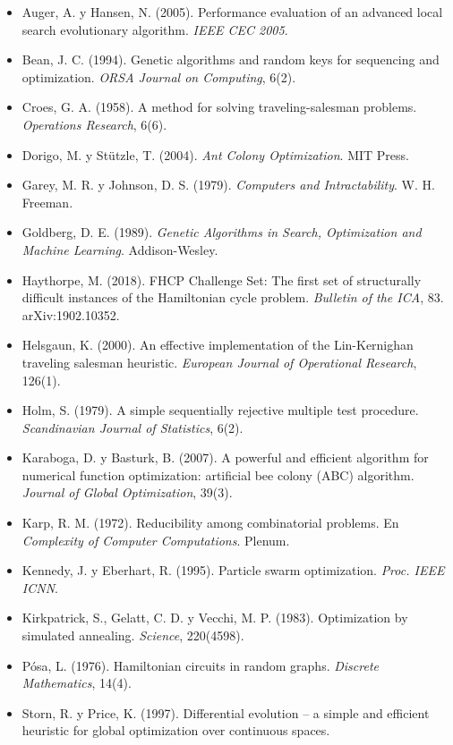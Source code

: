 \documentclass[
  spanish,
  12pt,
]{article}
\providecommand{\tightlist}{%
  \setlength{\itemsep}{0pt}\setlength{\parskip}{0pt}}
\begin{document}
\begin{itemize}
\tightlist
\item
  Auger, A. y Hansen, N. (2005). Performance evaluation of an advanced
  local search evolutionary algorithm. \emph{IEEE CEC 2005}.
\item
  Bean, J. C. (1994). Genetic algorithms and random keys for sequencing
  and optimization. \emph{ORSA Journal on Computing}, 6(2).
\item
  Croes, G. A. (1958). A method for solving traveling-salesman problems.
  \emph{Operations Research}, 6(6).
\item
  Dorigo, M. y Stützle, T. (2004). \emph{Ant Colony Optimization}. MIT
  Press.
\item
  Garey, M. R. y Johnson, D. S. (1979). \emph{Computers and
  Intractability}. W. H. Freeman.
\item
  Goldberg, D. E. (1989). \emph{Genetic Algorithms in Search,
  Optimization and Machine Learning}. Addison-Wesley.
\item
  Haythorpe, M. (2018). FHCP Challenge Set: The first set of
  structurally difficult instances of the Hamiltonian cycle problem.
  \emph{Bulletin of the ICA}, 83. arXiv:1902.10352.
\item
  Helsgaun, K. (2000). An effective implementation of the Lin-Kernighan
  traveling salesman heuristic. \emph{European Journal of Operational
  Research}, 126(1).
\item
  Holm, S. (1979). A simple sequentially rejective multiple test
  procedure. \emph{Scandinavian Journal of Statistics}, 6(2).
\item
  Karaboga, D. y Basturk, B. (2007). A powerful and efficient algorithm
  for numerical function optimization: artificial bee colony (ABC)
  algorithm. \emph{Journal of Global Optimization}, 39(3).
\item
  Karp, R. M. (1972). Reducibility among combinatorial problems. En
  \emph{Complexity of Computer Computations}. Plenum.
\item
  Kennedy, J. y Eberhart, R. (1995). Particle swarm optimization.
  \emph{Proc. IEEE ICNN}.
\item
  Kirkpatrick, S., Gelatt, C. D. y Vecchi, M. P. (1983). Optimization by
  simulated annealing. \emph{Science}, 220(4598).
\item
  Pósa, L. (1976). Hamiltonian circuits in random graphs. \emph{Discrete
  Mathematics}, 14(4).
\item
  Storn, R. y Price, K. (1997). Differential evolution -- a simple and
  efficient heuristic for global optimization over continuous spaces.

\end{itemize}
\end{document}
